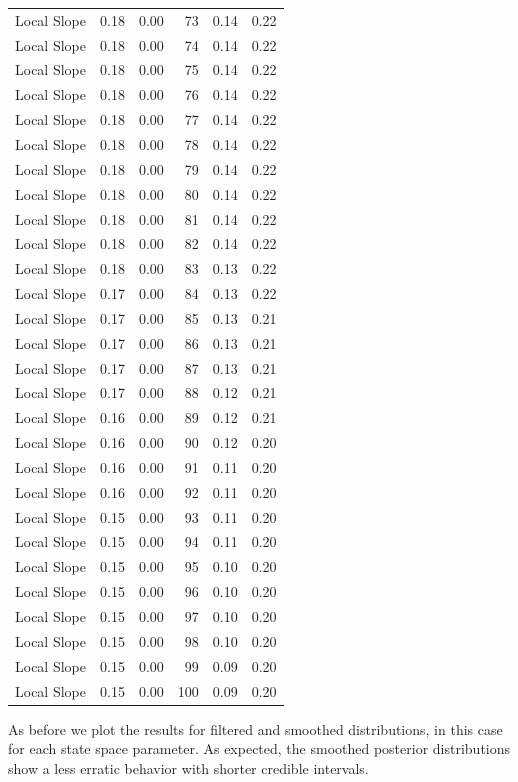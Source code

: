 \documentclass[
]{article}
\begin{document}
\begin{longtable}[]{@{}lrrrrr@{}}
Local Slope & 0.18 & 0.00 & 73 & 0.14 & 0.22 \\
Local Slope & 0.18 & 0.00 & 74 & 0.14 & 0.22 \\
Local Slope & 0.18 & 0.00 & 75 & 0.14 & 0.22 \\
Local Slope & 0.18 & 0.00 & 76 & 0.14 & 0.22 \\
Local Slope & 0.18 & 0.00 & 77 & 0.14 & 0.22 \\
Local Slope & 0.18 & 0.00 & 78 & 0.14 & 0.22 \\
Local Slope & 0.18 & 0.00 & 79 & 0.14 & 0.22 \\
Local Slope & 0.18 & 0.00 & 80 & 0.14 & 0.22 \\
Local Slope & 0.18 & 0.00 & 81 & 0.14 & 0.22 \\
Local Slope & 0.18 & 0.00 & 82 & 0.14 & 0.22 \\
Local Slope & 0.18 & 0.00 & 83 & 0.13 & 0.22 \\
Local Slope & 0.17 & 0.00 & 84 & 0.13 & 0.22 \\
Local Slope & 0.17 & 0.00 & 85 & 0.13 & 0.21 \\
Local Slope & 0.17 & 0.00 & 86 & 0.13 & 0.21 \\
Local Slope & 0.17 & 0.00 & 87 & 0.13 & 0.21 \\
Local Slope & 0.17 & 0.00 & 88 & 0.12 & 0.21 \\
Local Slope & 0.16 & 0.00 & 89 & 0.12 & 0.21 \\
Local Slope & 0.16 & 0.00 & 90 & 0.12 & 0.20 \\
Local Slope & 0.16 & 0.00 & 91 & 0.11 & 0.20 \\
Local Slope & 0.16 & 0.00 & 92 & 0.11 & 0.20 \\
Local Slope & 0.15 & 0.00 & 93 & 0.11 & 0.20 \\
Local Slope & 0.15 & 0.00 & 94 & 0.11 & 0.20 \\
Local Slope & 0.15 & 0.00 & 95 & 0.10 & 0.20 \\
Local Slope & 0.15 & 0.00 & 96 & 0.10 & 0.20 \\
Local Slope & 0.15 & 0.00 & 97 & 0.10 & 0.20 \\
Local Slope & 0.15 & 0.00 & 98 & 0.10 & 0.20 \\
Local Slope & 0.15 & 0.00 & 99 & 0.09 & 0.20 \\
Local Slope & 0.15 & 0.00 & 100 & 0.09 & 0.20 \\
\bottomrule
\end{longtable}

As before we plot the results for filtered and smoothed distributions,
in this case for each state space parameter. As expected, the smoothed
posterior distributions show a less erratic behavior with shorter
credible intervals.
\end{document}
